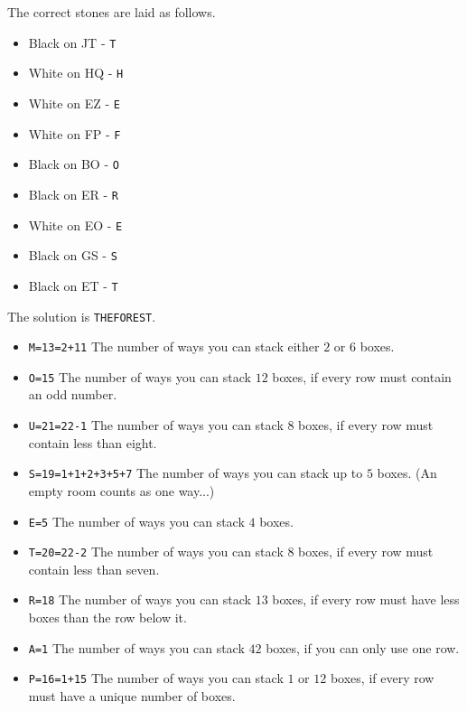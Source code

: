 

The correct stones are laid as follows.

\begin{multicols}{3}
\begin{itemize}
  \item Black on JT - \texttt{T}
  \item White on HQ - \texttt{H}
  \item White on EZ - \texttt{E}
  \item White on FP - \texttt{F}
  \item Black on BO - \texttt{O}
  \item Black on ER - \texttt{R}
  \item White on EO - \texttt{E}
  \item Black on GS - \texttt{S}
  \item Black on ET - \texttt{T}
\end{itemize}
\end{multicols}

The solution is \texttt{THEFOREST}.




\begin{multicols}{2}
  \begin{itemize}
    \item \texttt{M=13=2+11}
      The number of ways you can stack either \(2\) or \(6\) boxes.
    \item \texttt{O=15}
      The number of ways you can stack \(12\) boxes, if every row must
      contain an odd number.
    \item \texttt{U=21=22-1}
      The number of ways you can stack \(8\) boxes, if every row must contain
      less than eight.
    \item \texttt{S=19=1+1+2+3+5+7}
      The number of ways you can stack up to \(5\) boxes. (An empty room
      counts as one way...)
    \item \texttt{E=5}
      The number of ways you can stack \(4\) boxes.
  \end{itemize}
\columnbreak
  \begin{itemize}
    \item \texttt{T=20=22-2}
      The number of ways you can stack \(8\) boxes, if every row must contain
      less than seven.
    \item \texttt{R=18}
      The number of ways you can stack \(13\) boxes, if every row must have
      less boxes than the row below it.
    \item \texttt{A=1}
      The number of ways you can stack \(42\) boxes, if you can only use one
      row.
    \item \texttt{P=16=1+15}
      The number of ways you can stack \(1\) or \(12\) boxes, if every row must
      have a unique number of boxes.
  \end{itemize}
\end{multicols}

